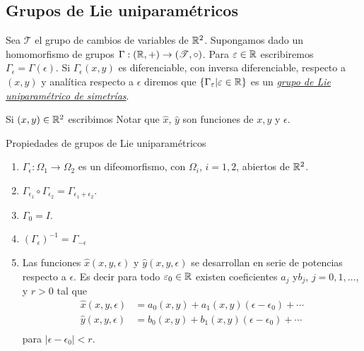 \subsection{Grupos de Lie uniparamétricos}

\begin{definicion}
Sea $\mathscr{T}$ el grupo de cambios de variables de $\mathbb{R}^2$. Supongamos dado un homomorfismo de grupos $\Gamma:(\mathbb{R},+)\to (\mathscr{T},\circ)$.  Para $\varepsilon\in\mathbb{R}$ escribiremos $\Gamma_{\epsilon}=\Gamma(\epsilon)$.  Si $\Gamma_{\epsilon}(x,y)$ es diferenciable, con inversa diferenciable, respecto a $(x,y)$ y analítica respecto a $\epsilon$ diremos que $\{\Gamma_{\varepsilon}|\varepsilon\in\mathbb{R}\}$ es un \href{http://es.wikipedia.org/wiki/Grupo_uniparamétrico}{\emph{grupo de Lie uniparamétrico de simetrías}}.
\end{definicion}


 Si $(x,y)\in\mathbb{R}^2$ escribimos
 Notar que $\hat{x}$, $\hat{y}$ son funciones de $x,y$ y $\epsilon$.



\begin{boite}[boxcolor=orange, background=blue!5, titlebackground=blue!20,
  titleboxcolor = black]{Propiedades de grupos de Lie uniparamétricos}
\begin{enumerate}
\item$\Gamma_{\epsilon}:\Omega_1\to\Omega_2$ es un difeomorfismo, con $\Omega_i$, $i=1,2$, abiertos de $\mathbb{R}^2$.
 \item $\Gamma_{\epsilon_1}\circ \Gamma_{\epsilon_2}=\Gamma_{\epsilon_1+\epsilon_2}$.

\item $\Gamma_0=I$.

\item $\left(\Gamma_{\epsilon}\right)^{-1}=\Gamma_{-\epsilon}$

\item Las funciones  $\hat{x}(x,y,\epsilon)$ y $\hat{y}(x,y,\epsilon)$  se desarrollan en serie de potencias respecto a $\epsilon$. Es decir para todo $\varepsilon_0\in\mathbb{R}$ existen coeficientes $a_j$ y$b_j$, $j=0,1,\ldots$, y $r>0$ tal que
\[
\begin{array}{cc}
\hat{x}(x,y,\epsilon)&=a_0(x,y)+a_1(x,y)(\epsilon- \epsilon_0)+\cdots\\
\hat{y}(x,y,\epsilon)&=b_0(x,y)+b_1(x,y)(\epsilon- \epsilon_0)+\cdots\\
\end{array}
\]
para $|\epsilon-\epsilon_0|<r$.
\end{enumerate}


\end{boite}



